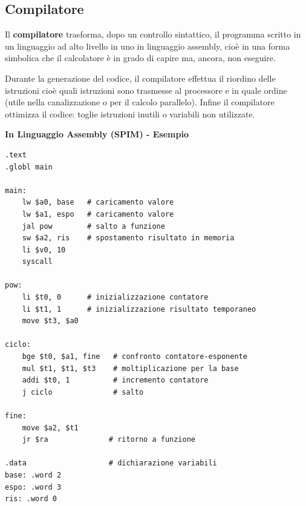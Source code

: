 \documentclass[12pt]{article}
\begin{document}
\subsection{Compilatore}
Il \textbf{compilatore} trasforma, dopo un controllo sintattico, il programma scritto in un linguaggio ad alto livello in uno in linguaggio assembly, cioè in una forma simbolica che il calcolatore è in grado di capire ma, ancora, non eseguire.\par\medskip\noindent 
Durante la generazione del codice, il compilatore effettua il riordino delle istruzioni cioè quali istruzioni sono trasmesse al processore e in quale ordine (utile nella canalizzazione o per il calcolo parallelo). Infine il compilatore ottimizza il codice: toglie istruzioni inutili o variabili non utilizzate.\par\medskip\noindent
\textbf{In Linguaggio Assembly (SPIM) - Esempio }
\begin{lstlisting}
.text
.globl main

main:
    lw $a0, base   # caricamento valore
    lw $a1, espo   # caricamento valore
    jal pow        # salto a funzione
    sw $a2, ris    # spostamento risultato in memoria
    li $v0, 10
    syscall

pow:
    li $t0, 0      # inizializzazione contatore
    li $t1, 1      # inizializzazione risultato temporaneo
    move $t3, $a0

ciclo:
    bge $t0, $a1, fine   # confronto contatore-esponente
    mul $t1, $t1, $t3    # moltiplicazione per la base
    addi $t0, 1          # incremento contatore
    j ciclo              # salto

fine:
    move $a2, $t1
    jr $ra              # ritorno a funzione

.data                   # dichiarazione variabili
base: .word 2
espo: .word 3
ris: .word 0
\end{lstlisting}
\newpage
\end{document}
